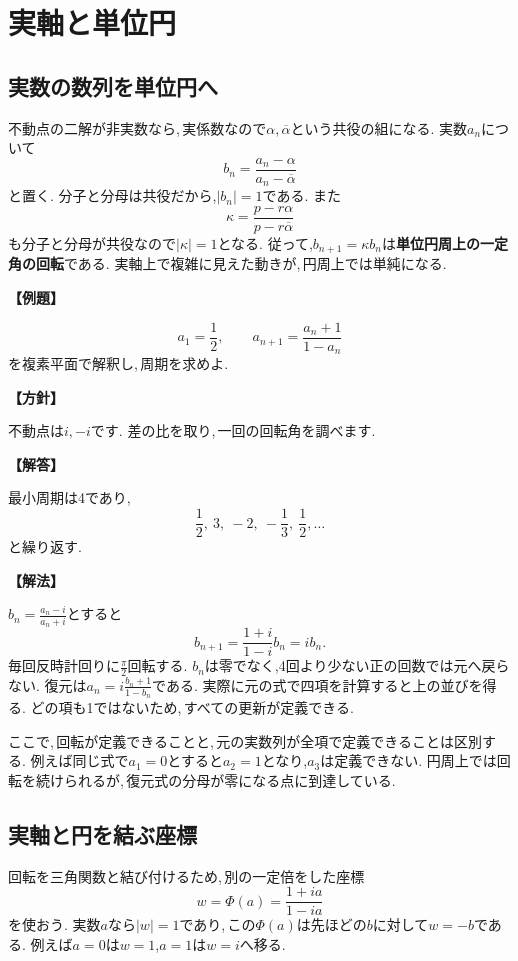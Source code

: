 \section{実軸と単位円}\label{節：実軸と単位円}
\subsection{実数の数列を単位円へ}

不動点の二解が非実数なら,\,実係数なので$\alpha,\overline\alpha$という共役の組になる.
実数$a_n$について
\[
 b_n=\frac{a_n-\alpha}{a_n-\overline\alpha}
\]
と置く.
分子と分母は共役だから,$|b_n|=1$である.
また
\[
 \kappa=\frac{p-r\alpha}{p-r\overline\alpha}
\]
も分子と分母が共役なので$|\kappa|=1$となる.
従って,$b_{n+1}=\kappa b_n$は\textbf{単位円周上の一定角の回転}である.
実軸上で複雑に見えた動きが,\,円周上では単純になる.

\noindent\textbf{【例題】}\par\nobreak
\[
 a_1=\frac12,\qquad a_{n+1}=\frac{a_n+1}{1-a_n}
\]
を複素平面で解釈し,\,周期を求めよ.

\noindent\textbf{【方針】}\par\nobreak
不動点は$i,-i$です. 差の比を取り,\,一回の回転角を調べます.

\noindent\textbf{【解答】}\par\nobreak
最小周期は4であり,
\[
 \frac12,\ 3,\ -2,\ -\frac13,\ \frac12,\ldots
\]
と繰り返す.

\noindent\textbf{【解法】}\par\nobreak
$b_n=\frac{a_n-i}{a_n+i}$とすると
\[
 b_{n+1}=\frac{1+i}{1-i}b_n=ib_n.
\]
毎回反時計回りに$\frac{\pi}{2}$回転する.
$b_n$は零でなく,4回より少ない正の回数では元へ戻らない.
復元は$a_n=i\frac{b_n+1}{1-b_n}$である.
実際に元の式で四項を計算すると上の並びを得る.
どの項も1ではないため,\,すべての更新が定義できる.

ここで,\,回転が定義できることと,\,元の実数列が全項で定義できることは区別する.
例えば同じ式で$a_1=0$とすると$a_2=1$となり,$a_3$は定義できない.
円周上では回転を続けられるが,\,復元式の分母が零になる点に到達している.

\subsection{実軸と円を結ぶ座標}\label{節：実軸と円を結ぶ座標}

回転を三角関数と結び付けるため,\,別の一定倍をした座標
\[
 w=\Phi(a)=\frac{1+ia}{1-ia}
\]
を使おう.
実数$a$なら$|w|=1$であり,\,この$\Phi(a)$は先ほどの$b$に対して$w=-b$である.
例えば$a=0$は$w=1$,$a=1$は$w=i$へ移る.

